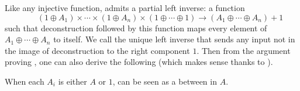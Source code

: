 Like any injective function,  admits a partial left inverse: a function
    \[ \qquad (1 \oplus A_1) \times \cdots \times (1 \oplus A_n) \times (1 \oplus \cdots
  \oplus 1) \longrightarrow (A_1 \oplus \cdots \oplus A_n) + 1 \]
such that deconstruction followed by this function maps every element of $A_1 \oplus \cdots \oplus A_n$ to itself.
We call  the unique left inverse that sends any input not in the image of deconstruction to the right component $1$. Then from the argument proving , one can also derive the following (which makes sense thanks to ).
\begin{lemma}\label{lem:reconstruction}
  When each $A_i$ is either $A$ or $1$,  can be seen as a  between  in $A$.
\end{lemma}
